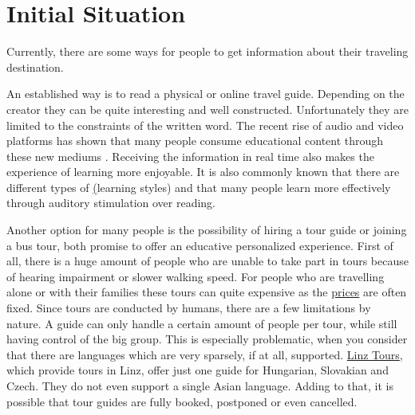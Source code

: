 \documentclass[12pt]{article}
\theoremstyle{definition}
\newenvironment{text}{
}{}
\begin{document}
\section{Initial Situation}
\begin{text}
Currently, there are some ways for people to get information about their traveling destination.\newline

An established way is to read a physical or online travel guide. Depending on the creator they can be quite interesting and well constructed. Unfortunately they are limited to the constraints of the written word. The recent rise of audio and video platforms has shown that many people consume educational content through these new mediums . Receiving the information in real time also makes the experience of learning more enjoyable. It is also commonly known that there are different types of \href{https://www.tandfonline.com/doi/full/10.1080/0144341042000228834}(learning styles) and that many people learn more effectively through auditory stimulation over reading.\newline
 
Another option for many people is the possibility of hiring a tour guide or joining a bus tour, both promise to offer an educative personalized experience. 
First of all, there is a huge amount of people who are unable to take part in tours because of hearing impairment or slower walking speed.
For people who are travelling alone or with their families these tours can quite expensive as the \href{https://www.guides-in-vienna.at/costs-terms//}{prices} are often fixed.
Since tours are conducted by humans, there are a few limitations by nature. A guide can only handle a certain amount of people per tour, while still having control of the big group. This is especially problematic, when you consider that there are languages which are very sparsely, if at all, supported. \href{https://linz-tours.at}{Linz Tours}, which provide tours in Linz, offer just one guide for Hungarian, Slovakian and Czech. They do not even support a single Asian language. Adding to that, it is possible that tour guides are fully booked, postponed or even cancelled.\newline
 

\end{text}
\end{document}

